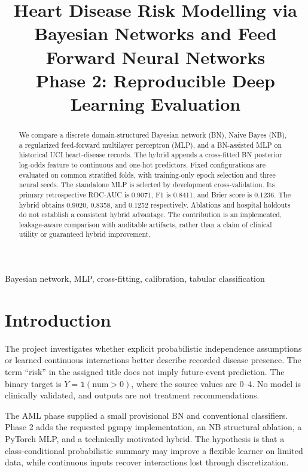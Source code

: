 \documentclass[conference]{IEEEtran}
\title{Heart Disease Risk Modelling via Bayesian Networks and Feed Forward Neural Networks\\Phase 2: Reproducible Deep Learning Evaluation}
\author{\IEEEauthorblockN{Project 15, Team T008}\IEEEauthorblockA{Academic capstone project\\Authorship and individual contributions to be confirmed by the team}}
\begin{document}
\maketitle
\begin{abstract}
We compare a discrete domain-structured Bayesian network (BN), Naive Bayes (NB), a regularized feed-forward multilayer perceptron (MLP), and a BN-assisted MLP on historical UCI heart-disease records. The hybrid appends a cross-fitted BN posterior log-odds feature to continuous and one-hot predictors. Fixed configurations are evaluated on common stratified folds, with training-only epoch selection and three neural seeds. The standalone MLP is selected by development cross-validation. Its primary retrospective ROC-AUC is 0.9071, F1 is 0.8411, and Brier score is 0.1236. The hybrid obtains 0.9020, 0.8358, and 0.1252 respectively. Ablations and hospital holdouts do not establish a consistent hybrid advantage. The contribution is an implemented, leakage-aware comparison with auditable artifacts, rather than a claim of clinical utility or guaranteed hybrid improvement.
\end{abstract}
\begin{IEEEkeywords}Bayesian network, MLP, cross-fitting, calibration, tabular classification\end{IEEEkeywords}
\section{Introduction}
The project investigates whether explicit probabilistic independence assumptions or learned continuous interactions better describe recorded disease presence. The term ``risk'' in the assigned title does not imply future-event prediction. The binary target is $Y=\mathbb{1}(\mathrm{num}>0)$, where the source values are 0--4. No model is clinically validated, and outputs are not treatment recommendations.

The AML phase supplied a small provisional BN and conventional classifiers. Phase 2 adds the requested pgmpy implementation, an NB structural ablation, a PyTorch MLP, and a technically motivated hybrid. The hypothesis is that a class-conditional probabilistic summary may improve a flexible learner on limited data, while continuous inputs recover interactions lost through discretization.
\end{document}
